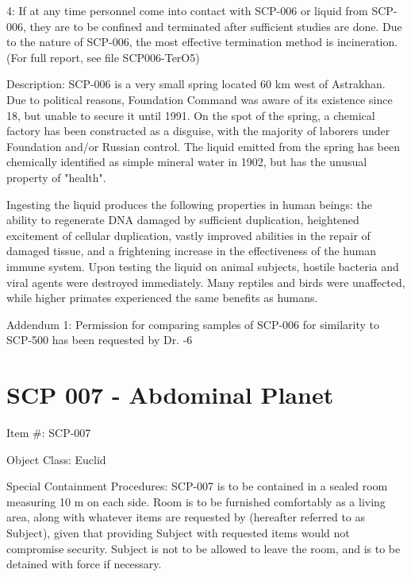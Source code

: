 \documentclass[a4paper, 11pt]{article}
\begin{document}
4: If at any time personnel come into contact with SCP-006 or liquid from SCP-006, they are to be confined and terminated after sufficient studies are done. Due to the nature of SCP-006, the most effective termination method is incineration. (For full report, see file SCP006-TerO5)

Description: SCP-006 is a very small spring located 60 km west of Astrakhan. Due to political reasons, Foundation Command was aware of its existence since 18, but unable to secure it until 1991. On the spot of the spring, a chemical factory has been constructed as a disguise, with the majority of laborers under Foundation and/or Russian control. The liquid emitted from the spring has been chemically identified as simple mineral water in 1902, but has the unusual property of "health".

Ingesting the liquid produces the following properties in human beings: the ability to regenerate DNA damaged by sufficient duplication, heightened excitement of cellular duplication, vastly improved abilities in the repair of damaged tissue, and a frightening increase in the effectiveness of the human immune system. Upon testing the liquid on animal subjects, hostile bacteria and viral agents were destroyed immediately. Many reptiles and birds were unaffected, while higher primates experienced the same benefits as humans.

Addendum 1: Permission for comparing samples of SCP-006 for similarity to SCP-500 has been requested by Dr. -6

\newpage
\section{SCP 007 - Abdominal Planet}
Item \#: SCP-007

Object Class: Euclid

Special Containment Procedures: SCP-007 is to be contained in a sealed room measuring 10 m on each side. Room is to be furnished comfortably as a living area, along with whatever items are requested by  (hereafter referred to as Subject), given that providing Subject with requested items would not compromise security. Subject is not to be allowed to leave the room, and is to be detained with force if necessary.
\end{document}
